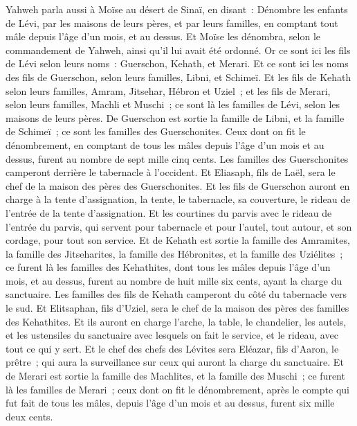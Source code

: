 \begin{multicols}{2}
Yahweh parla aussi à Moïse au désert de Sinaï, en disant~:
Dénombre les enfants de Lévi, par les maisons de leurs pères, et par leurs familles, en comptant tout mâle depuis l'âge d'un mois, et au dessus.
Et Moïse les dénombra, selon le commandement de Yahweh, ainsi qu'il lui avait été ordonné.
Or ce sont ici les fils de Lévi selon leurs noms~: Guerschon, Kehath, et Merari.
Et ce sont ici les noms des fils de Guerschon, selon leurs familles, Libni, et Schimeï.
Et les fils de Kehath selon leurs familles, Amram, Jitsehar, Hébron et Uziel~;
et les fils de Merari, selon leurs familles, Machli et Muschi~; ce sont là les familles de Lévi, selon les maisons de leurs pères.
De Guerschon est sortie la famille de Libni, et la famille de Schimeï~; ce sont les familles des Guerschonites.
Ceux dont on fit le dénombrement, en comptant de tous les mâles depuis l'âge d'un mois et au dessus, furent au nombre de sept mille cinq cents.
Les familles des Guerschonites camperont derrière le tabernacle à l'occident.
Et Eliasaph, fils de Laël, sera le chef de la maison des pères des Guerschonites.
Et les fils de Guerschon auront en charge à la tente d'assignation, la tente, le tabernacle, sa couverture, le rideau de l'entrée de la tente d'assignation.
Et les courtines du parvis avec le rideau de l'entrée du parvis, qui servent pour tabernacle et pour l'autel, tout autour, et son cordage, pour tout son service.
Et de Kehath est sortie la famille des Amramites, la famille des Jitseharites, la famille des Hébronites, et la famille des Uziélites~; ce furent là les familles des Kehathites,
dont tous les mâles depuis l'âge d'un mois, et au dessus, furent au nombre de huit mille six cents, ayant la charge du sanctuaire.
Les familles des fils de Kehath camperont du côté du tabernacle vers le sud.
Et Elitsaphan, fils d'Uziel, sera le chef de la maison des pères des familles des Kehathites.
Et ils auront en charge l'arche, la table, le chandelier, les autels, et les ustensiles du sanctuaire avec lesquels on fait le service, et le rideau, avec tout ce qui y sert.
Et le chef des chefs des Lévites sera Eléazar, fils d'Aaron, le prêtre~; qui aura la surveillance sur ceux qui auront la charge du sanctuaire.
Et de Merari est sortie la famille des Machlites, et la famille des Muschi~; ce furent là les familles de Merari~;
ceux dont on fit le dénombrement, après le compte qui fut fait de tous les mâles, depuis l'âge d'un mois et au dessus, furent six mille deux cents.

\end{multicols}
